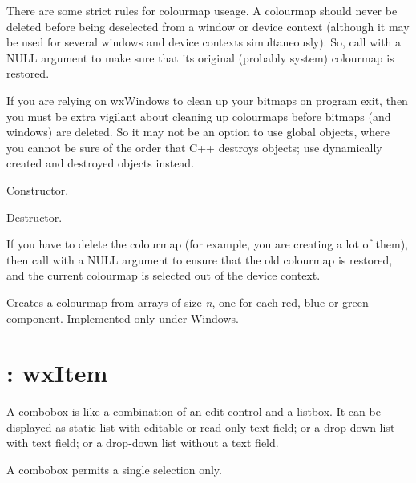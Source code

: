 There are some strict rules for colourmap useage. A colourmap should
never be deleted before being deselected from a window or device
context (although it may be used for several windows and device
contexts simultaneously). So, call \rtfsp
with a NULL argument to make sure that its original (probably system)
colourmap is restored.

If you are relying on wxWindows to clean up your bitmaps on program
exit, then you must be extra vigilant about cleaning up colourmaps
before bitmaps (and windows) are deleted. So it may not be an option
to use global objects, where you cannot be sure of the order
that C++ destroys objects; use dynamically created and destroyed
objects instead.



Constructor.



Destructor.

If you have to delete the colourmap (for example, you are creating a lot of
them), then call  with a NULL argument
to ensure that the old colourmap is restored, and the current colourmap is selected
out of the device context.



Creates a colourmap from arrays of size {\it n}, one for each
red, blue or green component. Implemented only under Windows.



\section{: wxItem}\label{wxcombobox}

A combobox is like a combination of an edit control and a listbox. It can be
displayed as static list with editable or read-only text field; or a drop-down list with
text field; or a drop-down list without a text field.

A combobox permits a single selection only.

